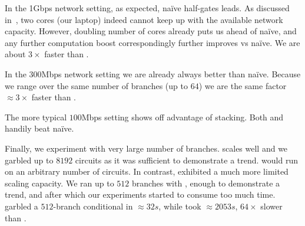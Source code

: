In the 1Gbps network setting, as expected, na\"ive half-gates leads.  As discussed in~, two cores (our laptop) indeed cannot keep up with the available network capacity.  However, doubling number of cores already puts us ahead of na\"ive, and any further computation boost correspondingly further improves \ourschemelong vs na\"ive.  We are about $3\times$ faster than \stack.

In the 300Mbps network setting we are already always better than na\"ive.  Because we range over the same number of branches (up to $64$) we are the same factor $\approx 3\times$ faster than \stack.

The more typical $100$Mbps setting shows off advantage of stacking.  Both \stack and \ourschemelong handily beat na\"ive.

Finally, we experiment with very large number of branches.  \ourschemelong scales well and we garbled up to $8192$ circuits as it was sufficient to demonstrate a trend.  \ourschemelong would run on an arbitrary number of circuits.  In contrast, \stack exhibited a much more limited scaling capacity.  We ran up to $512$ branches with \stack, enough to demonstrate a trend, and after which our experiments started to consume too much time.   \ourschemelong garbled a $512$-branch conditional in $\approx 32s$, while \stack took $\approx 2053s$,  $64\times$ slower than \ourschemelong.


